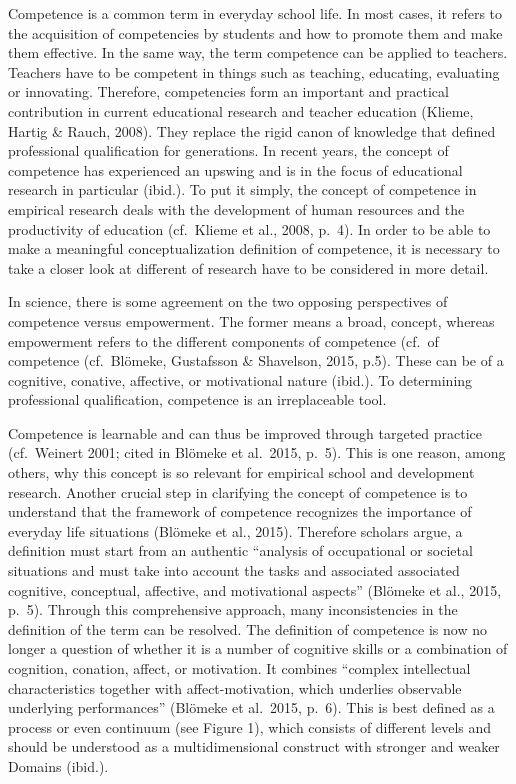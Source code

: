 \documentclass[
  man]{apa6}
\begin{document}
Competence is a common term in everyday school life. In most cases, it refers to the acquisition of competencies by students and how to promote them and make them effective. In the same way, the term competence can be applied to teachers. Teachers have to be competent in things such as teaching, educating, evaluating or innovating. Therefore, competencies form an important and practical contribution in current educational research and teacher education (Klieme, Hartig \& Rauch, 2008). They replace the rigid canon of knowledge that defined professional qualification for generations. In recent years, the concept of competence has experienced an upswing and is in the focus of educational research in particular (ibid.). To put it simply, the concept of competence in empirical research deals with the development of human resources and the productivity of education (cf.~Klieme et al., 2008, p.~4). In order to be able to make a meaningful conceptualization definition of competence, it is necessary to take a closer look at different of research have to be considered in more detail.

In science, there is some agreement on the two opposing perspectives of competence versus empowerment. The former means a broad, concept, whereas empowerment refers to the different components of competence (cf.~of competence (cf.~Blömeke, Gustafsson \& Shavelson, 2015, p.5). These can be of a cognitive, conative, affective, or motivational nature (ibid.). To determining professional qualification, competence is an irreplaceable tool.

Competence is learnable and can thus be improved through targeted practice (cf.~Weinert 2001; cited in Blömeke et al.~2015, p.~5). This is one reason, among others, why this concept is so relevant for empirical school and development research. Another crucial step in clarifying the concept of competence is to understand that the framework of competence recognizes the importance of everyday life situations (Blömeke et al., 2015). Therefore scholars argue, a definition must start from an authentic ``analysis of occupational or societal situations and must take into account the tasks and associated associated cognitive, conceptual, affective, and motivational aspects'' (Blömeke et al., 2015, p.~5). Through this comprehensive approach, many inconsistencies in the definition of the term can be resolved. The definition of competence is now no longer a question of whether it is a number of cognitive skills or a combination of cognition, conation, affect, or motivation. It combines ``complex intellectual characteristics together with affect-motivation, which underlies observable underlying performances'' (Blömeke et al.~2015, p.~6). This is best defined as a process or even continuum (see Figure 1), which consists of different levels and should be understood as a multidimensional construct with stronger and weaker Domains (ibid.).
\end{document}
